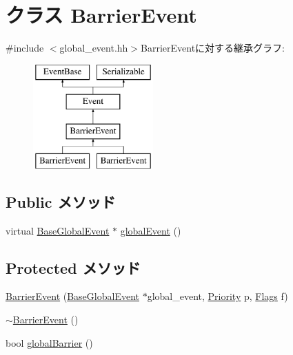\hypertarget{classBaseGlobalEvent_1_1BarrierEvent}{
\section{クラス BarrierEvent}
\label{classBaseGlobalEvent_1_1BarrierEvent}
}


{\ttfamily \#include $<$global\_\-event.hh$>$}BarrierEventに対する継承グラフ:\begin{figure}[H]
\begin{center}
\leavevmode
\includegraphics[height=4cm]{classBaseGlobalEvent_1_1BarrierEvent}
\end{center}
\end{figure}
\subsection*{Public メソッド}
\begin{DoxyCompactItemize}
\item 
virtual \hyperlink{classBaseGlobalEvent}{BaseGlobalEvent} $\ast$ \hyperlink{classBaseGlobalEvent_1_1BarrierEvent_a22afab66586c2982ac7548fba9e6835b}{globalEvent} ()
\end{DoxyCompactItemize}
\subsection*{Protected メソッド}
\begin{DoxyCompactItemize}
\item 
\hyperlink{classBaseGlobalEvent_1_1BarrierEvent_a9b16536f17a949fbf1c0c96ae5f7e427}{BarrierEvent} (\hyperlink{classBaseGlobalEvent}{BaseGlobalEvent} $\ast$global\_\-event, \hyperlink{classEventBase_a6d92f7ee8144a5911ed46d85a89a4934}{Priority} p, \hyperlink{classFlags}{Flags} f)
\item 
\hyperlink{classBaseGlobalEvent_1_1BarrierEvent_afe56c60259093b6c1ee131062e18789f}{$\sim$BarrierEvent} ()
\item 
bool \hyperlink{classBaseGlobalEvent_1_1BarrierEvent_a32c5ab78a77d98e32aba77e992493b71}{globalBarrier} ()
\end{DoxyCompactItemize}
